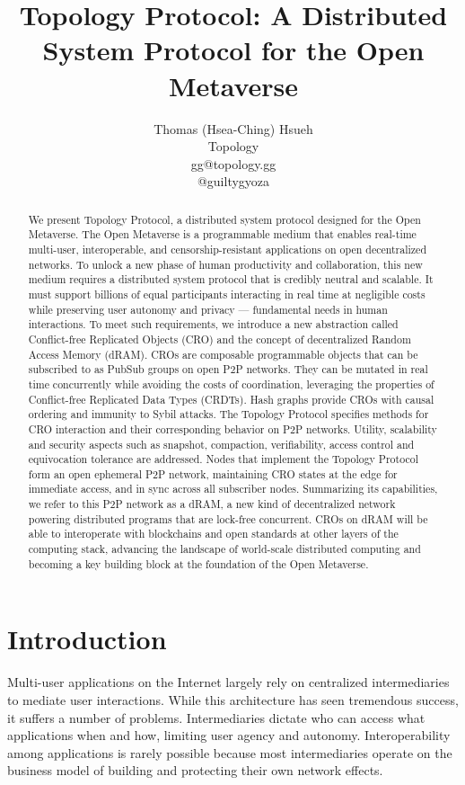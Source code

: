 \documentclass{article}
\title{Topology Protocol: A Distributed System Protocol for the Open Metaverse}
\author{
 Thomas (Hsea-Ching) Hsueh \\
 Topology \\
 gg@topology.gg \\
 @guiltygyoza
}
\begin{document}
\maketitle


\begin{abstract}

We present Topology Protocol, a distributed system protocol designed for the Open Metaverse. The Open Metaverse is a programmable medium that enables real-time multi-user, interoperable, and censorship-resistant applications on open decentralized networks. To unlock a new phase of human productivity and collaboration, this new medium requires a distributed system protocol that is credibly neutral and scalable. It must support billions of equal participants interacting in real time at negligible costs while preserving user autonomy and privacy — fundamental needs in human interactions. To meet such requirements, we introduce a new abstraction called Conflict-free Replicated Objects (CRO) and the concept of decentralized Random Access Memory (dRAM). CROs are composable programmable objects that can be subscribed to as PubSub groups on open P2P networks. They can be mutated in real time concurrently while avoiding the costs of coordination, leveraging the properties of Conflict-free Replicated Data Types (CRDTs). Hash graphs provide CROs with causal ordering and immunity to Sybil attacks. The Topology Protocol specifies methods for CRO interaction and their corresponding behavior on P2P networks. Utility, scalability and security aspects such as snapshot, compaction, verifiability, access control and equivocation tolerance are addressed. Nodes that implement the Topology Protocol form an open ephemeral P2P network, maintaining CRO states at the edge for immediate access, and in sync across all subscriber nodes. Summarizing its capabilities, we refer to this P2P network as a dRAM, a new kind of decentralized network powering distributed programs that are lock-free concurrent. CROs on dRAM will be able to interoperate with blockchains and open standards at other layers of the computing stack, advancing the landscape of world-scale distributed computing and becoming a key building block at the foundation of the Open Metaverse.
\end{abstract}



\section{Introduction}
Multi-user applications on the Internet largely rely on centralized intermediaries to mediate user interactions. While this architecture has seen tremendous success, it suffers a number of problems. Intermediaries dictate who can access what applications when and how, limiting user agency and autonomy. Interoperability among applications is rarely possible because most intermediaries operate on the business model of building and protecting their own network effects.
\end{document}
